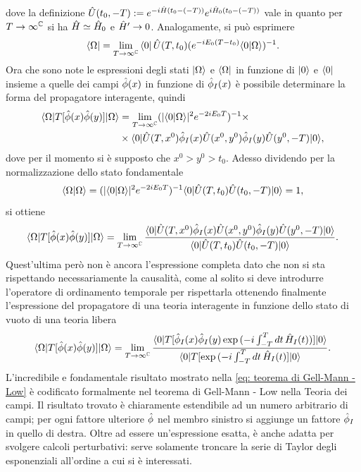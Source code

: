 dove la definizione $\hat{U}(t_0,-T) := e^{-i\hat{H} (t_0 - (-T))}e^{i\hat{H}_0(t_0 - (-T))}$ vale in quanto per $T\to\infty^{\mathbb{C}}$ si ha $\hat{H}\simeq\hat{H}_0$ e $\hat{H}'\to0$. Analogamente, si può esprimere 
\begin{equation}
    \bra{\Omega} = \lim_{T\to\infty^{\mathbb{C}}}\bra{0}\hat{U}(T,t_0)(e^{-iE_0(T - t_0)}\langle 0 | \Omega \rangle)^{-1}.
\end{equation}
Ora che sono note le espressioni degli stati $\ket{\Omega}$ e $\bra{\Omega}$ in funzione di $\ket{0}$ e $\bra{0}$ insieme a quelle dei campi $\hat{\phi}(x)$ in funzione di $\hat{\phi}_I(x)$ è possibile determinare la forma del propagatore interagente, quindi
\begin{equation}
    \begin{split}
        \langle \Omega | T[\hat{\phi}(x)\hat{\phi}(y)] | \Omega \rangle &= \lim_{T\to\infty^{\mathbb{C}}}(|\langle 0 | \Omega \rangle|^2e^{-2iE_0T})^{-1} \times \\
        &\times\langle 0 | \hat{U}(T,x^0)\hat{\phi}_I(x)\hat{U}(x^0,y^0)\hat{\phi}_I(y)\hat{U}(y^0,-T) | 0 \rangle,
    \end{split}
\end{equation}
dove per il momento si è supposto che $x^0 > y^0 > t_0$. Adesso dividendo per la normalizzazione dello stato fondamentale 
\begin{equation}
    \langle \Omega | \Omega \rangle = (|\langle 0 | \Omega \rangle|^2e^{-2iE_0T})^{-1}\langle 0 | \hat{U}(T,t_0)\hat{U}(t_0,-T) | 0 \rangle = 1,
\end{equation}
si ottiene 
\begin{equation}
    \langle \Omega | T[\hat{\phi}(x)\hat{\phi}(y)] | \Omega \rangle = \lim_{T\to\infty^{\mathbb{C}}}\frac{\langle 0 | \hat{U}(T,x^0)\hat{\phi}_I(x)\hat{U}(x^0,y^0)\hat{\phi}_I(y)\hat{U}(y^0,-T) | 0 \rangle}{\langle 0 | \hat{U}(T,t_0)\hat{U}(t_0,-T) | 0 \rangle}.
\end{equation}
Quest'ultima però non è ancora l'espressione completa dato che non si sta rispettando necessariamente la causalità, come al solito si deve introdurre l'operatore di ordinamento temporale per rispettarla ottenendo finalmente l'espressione del propagatore di una teoria interagente in funzione dello stato di vuoto di una teoria libera
\begin{equation}
\label{eq: teorema di Gell-Mann - Low}
    \langle \Omega | T[\hat{\phi}(x)\hat{\phi}(y)] | \Omega \rangle = \lim_{T\to\infty^{\mathbb{C}}}\frac{\langle 0 | T[\hat{\phi}_I(x)\hat{\phi}_I(y)\exp{(-i\int_{-T}^Tdt\,\hat{H}_I(t))}] | 0 \rangle}{\langle 0 | T[\exp{(-i\int_{-T}^Tdt\,\hat{H}_I(t)}] | 0 \rangle}.
\end{equation}
L'incredibile e fondamentale risultato mostrato nella \eqref{eq: teorema di Gell-Mann - Low} è codificato formalmente nel teorema di Gell-Mann - Low nella Teoria dei campi. Il risultato trovato è chiaramente estendibile ad un numero arbitrario di campi; per ogni fattore ulteriore $\hat{\phi}$ nel membro sinistro si aggiunge un fattore $\hat{\phi}_I$ in quello di destra. Oltre ad essere un'espressione esatta, è anche adatta per svolgere calcoli perturbativi: serve solamente troncare la serie di Taylor degli esponenziali all'ordine a cui si è interessati.

